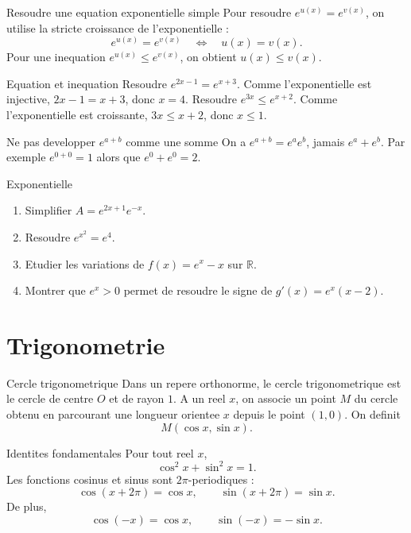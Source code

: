 \documentclass[11pt,a4paper]{article}
\newcommand{\R}{\mathbb{R}}
\begin{document}
\begin{boitemethode}{Resoudre une equation exponentielle simple}
Pour resoudre $e^{u(x)}=e^{v(x)}$, on utilise la stricte croissance de l'exponentielle :
\[
e^{u(x)}=e^{v(x)}\quad\Longleftrightarrow\quad u(x)=v(x).
\]
Pour une inequation $e^{u(x)}\le e^{v(x)}$, on obtient $u(x)\le v(x)$.
\end{boitemethode}

\begin{boiteexemple}{Equation et inequation}
Resoudre $e^{2x-1}=e^{x+3}$. Comme l'exponentielle est injective, $2x-1=x+3$, donc $x=4$.
\smallskip
Resoudre $e^{3x}\le e^{x+2}$. Comme l'exponentielle est croissante, $3x\le x+2$, donc $x\le1$.
\end{boiteexemple}

\begin{boiteattention}{Ne pas developper $e^{a+b}$ comme une somme}
On a $e^{a+b}=e^ae^b$, jamais $e^a+e^b$. Par exemple $e^{0+0}=1$ alors que $e^0+e^0=2$.
\end{boiteattention}

\begin{exobox}{Exponentielle}
\begin{enumerate}
  \item Simplifier $A=e^{2x+1}e^{-x}$.
  \item Resoudre $e^{x^2}=e^{4}$.
  \item Etudier les variations de $f(x)=e^x-x$ sur $\R$.
  \item Montrer que $e^x>0$ permet de resoudre le signe de $g'(x)=e^x(x-2)$.
\end{enumerate}
\end{exobox}


\section{Trigonometrie}

\begin{boitecours}{Cercle trigonometrique}
Dans un repere orthonorme, le cercle trigonometrique est le cercle de centre $O$ et de rayon $1$. A un reel $x$, on associe un point $M$ du cercle obtenu en parcourant une longueur orientee $x$ depuis le point $(1,0)$. On definit
\[
M(\cos x,\sin x).
\]
\end{boitecours}

\begin{boitecours}{Identites fondamentales}
Pour tout reel $x$,
\[
\cos^2 x+\sin^2 x=1.
\]
Les fonctions cosinus et sinus sont $2\pi$-periodiques :
\[
\cos(x+2\pi)=\cos x,
\qquad \sin(x+2\pi)=\sin x.
\]
De plus,
\[
\cos(-x)=\cos x,
\qquad \sin(-x)=-\sin x.
\]
\end{boitecours}
\end{document}
